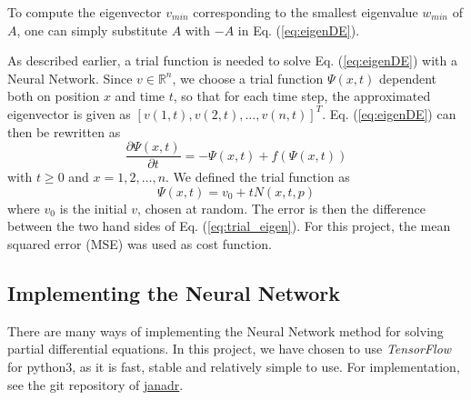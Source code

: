To compute the eigenvector $v_{min}$ corresponding to the smallest eigenvalue $w_{min}$ of $A$, one can simply substitute $A$ with $-A$ in Eq. (\ref{eq:eigenDE}).

As described earlier, a trial function is needed to solve Eq. (\ref{eq:eigenDE}) with a Neural Network. Since $v \in \mathbb{R}^n$, we choose a trial function $\Psi(x,t)$ dependent both on position $x$ and time $t$, so that for each time step, the approximated eigenvector is given as $[v(1,t), v(2,t), \ldots, v(n,t)]^T$. Eq. (\ref{eq:eigenDE}) can then be rewritten as
\begin{equation}\label{eq:trial_eigen}
	\frac{\partial \Psi(x,t)}{\partial t} = -\Psi(x,t) + f(\Psi(x,t))
\end{equation}
with $t \geq 0$ and $x=1,2,\ldots,n$. We defined the trial function as 
\begin{equation*}
	 \Psi(x,t) = v_0 + tN(x,t,p)
\end{equation*}
where $v_0$ is the initial $v$, chosen at random.   
The error is then the difference between the two hand sides of Eq. (\ref{eq:trial_eigen}). For this project, the mean squared error (MSE) was used as cost function. 

\subsection{Implementing the Neural Network}
There are many ways of implementing the Neural Network method for solving partial differential equations. In this project, we have chosen to use \textit{TensorFlow} for python3, as it is fast, stable and relatively simple to use. For implementation, see the git repository of \href{https://github.com/janadr/FYS-STK4155/tree/master/project3/code}{janadr}.
